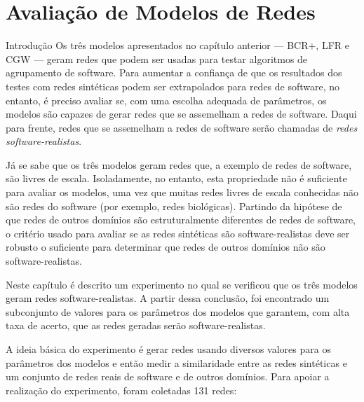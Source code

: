 %	
%

\chapter{Avaliação de Modelos de Redes} \label{cap:avaliacao}

\begin{section}{Introdução}
Os três modelos apresentados no capítulo anterior --- BCR+, LFR e CGW --- geram redes que podem ser usadas para testar algoritmos de agrupamento de software. Para aumentar a confiança de que os resultados dos testes com redes sintéticas podem ser extrapolados para redes de software, no entanto, é preciso avaliar se, com uma escolha adequada de parâmetros, os modelos são capazes de gerar redes que se assemelham a redes de software. Daqui para frente, redes que se assemelham a redes de software serão chamadas de \emph{redes software-realistas}.

Já se sabe que os três modelos geram redes que, a exemplo de redes de software, são livres de escala. Isoladamente, no entanto, esta propriedade não é suficiente para avaliar os modelos, uma vez que muitas redes livres de escala conhecidas não são redes do software (por exemplo, redes biológicas). Partindo da hipótese de que redes de outros domínios são estruturalmente diferentes de redes de software, o critério usado para avaliar se as redes sintéticas são software-realistas deve ser robusto o suficiente para determinar que redes de outros domínios não são software-realistas.

Neste capítulo é descrito um experimento no qual se verificou que os três modelos geram redes software-realistas. A partir dessa conclusão, foi encontrado um subconjunto de valores para os parâmetros dos modelos que garantem, com alta taxa de acerto, que as redes geradas serão software-realistas.

A ideia básica do experimento é gerar redes usando diversos valores para os parâmetros dos modelos e então medir a similaridade entre as redes sintéticas e um conjunto de redes reais de software e de outros domínios. Para apoiar a realização do experimento, foram coletadas 131 redes:


\end{section}
